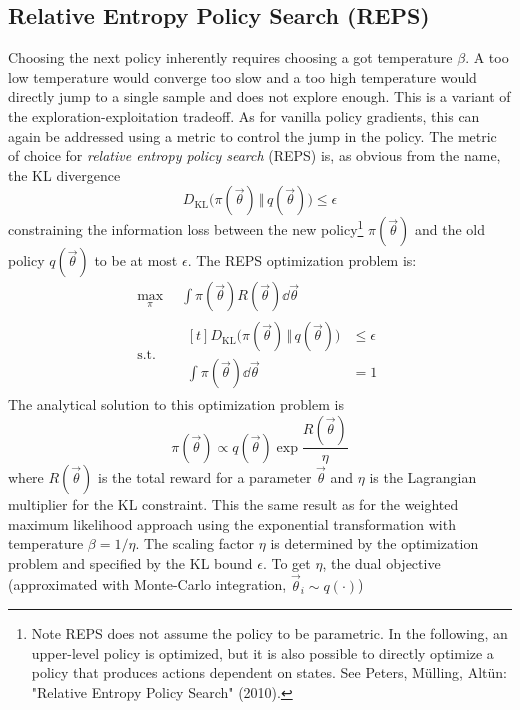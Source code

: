 		\subsection{Relative Entropy Policy Search (REPS)}
			Choosing the next policy inherently requires choosing a got temperature \(\beta\). A too low temperature would converge too slow and a too high temperature would directly jump to a single sample and does not explore enough. This is a variant of the exploration-exploitation tradeoff. As for vanilla policy gradients, this can again be addressed using a metric to control the jump in the policy. The metric of choice for \emph{relative entropy policy search} (REPS) is, as obvious from the name, the KL divergence
			\begin{equation*}
				D_\mathrm{KL}\big( \pi(\vec{\theta}) \,\Vert\, q(\vec{\theta}) \big) \leq \epsilon
			\end{equation*}
			constraining the information loss between the new policy\footnote{Note REPS does not assume the policy to be parametric. In the following, an upper-level policy is optimized, but it is also possible to directly optimize a policy that produces actions dependent on states. See Peters, Mülling, Altün: "Relative Entropy Policy Search" (2010).} \(\pi(\vec{\theta})\) and the old policy \(q(\vec{\theta})\) to be at most \(\epsilon\). The REPS optimization problem is:
			\begin{equation}
				\begin{aligned}
					\max_\pi \,& \int\! \pi(\vec{\theta}) R(\vec{\theta}) \dd{\vec{\theta}} \\
					\mathrm{s.t.} \quad&
						\begin{aligned}[t]
							D_\mathrm{KL}\big( \pi(\vec{\theta}) \,\Vert\, q(\vec{\theta}) \big) &\leq \epsilon \\
							\int\! \pi(\vec{\theta}) \dd{\vec{\theta}} &= 1
						\end{aligned}
				\end{aligned}
			\end{equation}
			The analytical solution to this optimization problem is
			\begin{equation*}
				\pi(\vec{\theta}) \propto q(\vec{\theta}) \exp{ \frac{R(\vec{\theta})}{\eta} }
			\end{equation*}
			where \( R(\vec{\theta}) \) is the total reward for a parameter \( \vec{\theta} \) and \(\eta\) is the Lagrangian multiplier for the KL constraint. This the same result as for the weighted maximum likelihood approach using the exponential transformation with temperature \( \beta = 1/\eta \). The scaling factor \(\eta\) is determined by the optimization problem and specified by the KL bound \(\epsilon\). To get \(\eta\), the dual objective (approximated with Monte-Carlo integration, \( \vec{\theta}_i \sim q(\cdot) \))
